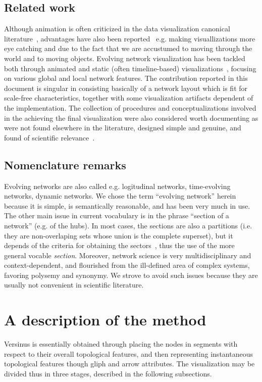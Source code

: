 \documentclass[runningheads]{llncs}
\begin{document}
\subsection{Related work}
Although animation is often criticized in the data visualization canonical literature~\cite{munzner,ware}, advantages have also been reported~\cite{cog,anim} e.g. making visuallizations more eye catching and due to the fact that we are accustumed to moving through the world and to moving objects.
Evolving network visualization has been tackled both through animated and static (often timeline-based) visualizations~\cite{ego,brain,visAn}, focusing on various global and local network features.
The contribution reported in this document is singular in consisting basically of a network layout which is fit for scale-free characteristics, together with some visualization artifacts dependent of the implementation.
The collection of procedures and conceptualizations involved in the achieving the final visualization were also considered worth documenting as were not found elsewhere in the literature, designed simple and genuine, and found of scientific relevance~\cite{stab}.

\subsection{Nomenclature remarks}
Evolving networks are also called e.g. logitudinal networks, time-evolving networks, dynamic networks.
We chose the term ``evolving network'' herein because it is simple, is semantically reasonable, and has been very much in use.
The other main issue in current vocabulary is in the phrase ``section of a network'' (e.g. of the hubs). In most cases, the sections are also a partitions (i.e. they are non-overlaping sets whose union is the complete superset), but it depends of the criteria for obtaining the sectors~\cite{stab}, thus the use of the more general vocable \emph{section}.
Moreover, network science is very multidisciplinary and context-dependent, and flourished from the ill-defined area of complex systems, favoring polysemy and synonymy. We strove to avoid such issues because they are usually not convenient in scientific literature.

\section{A description of the method}\label{sec:des}
Versinus is essentially obtained through placing the nodes in segments
with respect to their overall topological features, and then representing
instantaneous topological features though gliph and arrow attributes.
The visualization may be divided thus in three stages, described in the following subsections.
\end{document}
